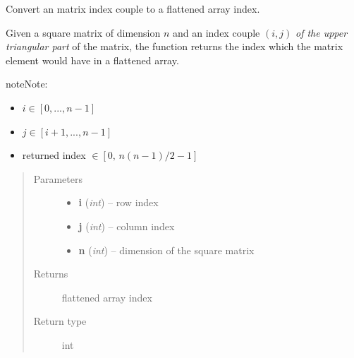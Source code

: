 \documentclass[letterpaper,10pt,english]{sphinxmanual}
\begin{document}
\begin{fulllineitems}
\begin{fulllineitems}
\end{fulllineitems}


\begin{fulllineitems}
\label{source/src:src.bicm.BiCM.triumat2flat_idx}
Convert an matrix index couple to a flattened array index.

Given a square matrix of dimension \(n\) and an index couple
\((i, j)\) \emph{of the upper triangular part} of the matrix, the
function returns the index which the matrix element would have in a
flattened array.

\begin{notice}{note}{Note:}\begin{itemize}
\item {} 
\(i \in [0, ..., n - 1]\)

\item {} 
\(j \in [i + 1, ..., n - 1]\)

\item {} 
returned index \(\in [0,\, n (n - 1) / 2 - 1]\)

\end{itemize}
\end{notice}
\begin{quote}\begin{description}
\item[{Parameters}] \leavevmode\begin{itemize}
\item {} 
\textbf{i} (\emph{int}) -- row index

\item {} 
\textbf{j} (\emph{int}) -- column index

\item {} 
\textbf{n} (\emph{int}) -- dimension of the square matrix

\end{itemize}

\item[{Returns}] \leavevmode
flattened array index

\item[{Return type}] \leavevmode
int

\end{description}\end{quote}

\end{fulllineitems}


\end{fulllineitems}
\end{document}
